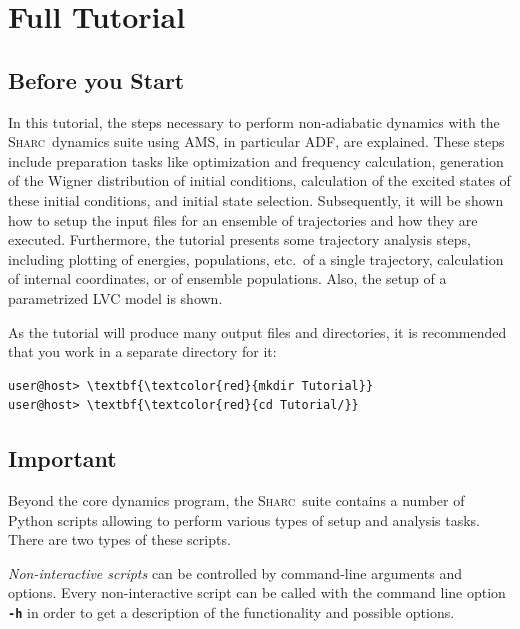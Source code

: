 \documentclass[a4paper,11pt,DIV=15,openany]{scrbook}
\newcommand{\sharc}{\textsc{Sharc}}
\newcommand{\ttt}[1]{\textbf{\texttt{#1}}}
\begin{document}

\chapter{Full Tutorial}\label{chap:full}
\section{Before you Start}

In this tutorial, the steps necessary to perform non-adiabatic dynamics with the \sharc\ dynamics suite using \textsc{AMS}, in particular \textsc{ADF}, are explained.
These steps include preparation tasks like optimization and frequency calculation, generation of the Wigner distribution of initial conditions, calculation of the excited states of these initial conditions, and initial state selection. 
Subsequently, it will be shown how to setup the input files for an ensemble of trajectories and how they are executed.
Furthermore, the tutorial presents some trajectory analysis steps, including plotting of energies, populations, etc.\ of a single trajectory, calculation of internal coordinates, or of ensemble populations.
Also, the setup of a parametrized LVC model is shown.

As the tutorial will produce many output files and directories, it is recommended that you work in a separate directory for it:
\begin{Verbatim}[commandchars=\\\{\}]
user@host> \textbf{\textcolor{red}{mkdir Tutorial}}
user@host> \textbf{\textcolor{red}{cd Tutorial/}}
\end{Verbatim}

\section{Important}

Beyond the core dynamics program, the \sharc\ suite contains a number of Python scripts allowing to perform various types of setup and analysis tasks. 
There are two types of these scripts.

\emph{Non-interactive scripts} can be controlled by command-line arguments and options. 
Every non-interactive script can be called with the command line option \ttt{-h} in order to get a description of the functionality and possible options.
\end{document}
